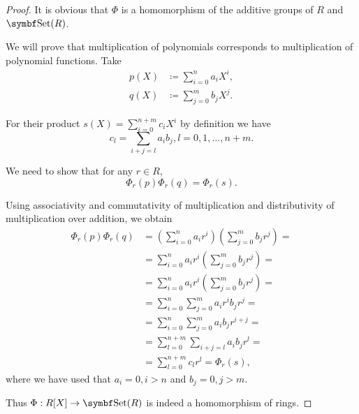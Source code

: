 \begin{proof}
  It is obvious that \( \Phi \) is a homomorphism of the additive groups of \( R \) and \( \Cat{Set}(R) \).

  We will prove that multiplication of polynomials corresponds to multiplication of polynomial functions. Take
  \begin{align*}
    p(X) &\coloneqq \sum_{i=0}^n a_i X^i, \\
    q(X) &\coloneqq \sum_{j=0}^m b_j X^j.
  \end{align*}

  For their product \( s(X) = \sum_{i=0}^{n + m} c_i X^i \) by definition we have
  \begin{equation*}
    c_l = \sum_{i+j=l} a_i b_j, l = 0, 1, \ldots, n + m.
  \end{equation*}

  We need to show that for any \( r \in R \),
  \begin{equation*}
    \Phi_r(p) \Phi_r(q) = \Phi_r(s).
  \end{equation*}

  Using associativity and commutativity of multiplication and distributivity of multiplication over addition, we obtain
  \begin{align*}
    \Phi_r(p) \Phi_r(q)
    &=
    \left( \sum_{i=0}^n a_i r^i \right) \left( \sum_{j=0}^m b_j r^j \right)
    = \\ &=
    \sum_{i=0}^n a_i r^i \left( \sum_{j=0}^m b_j r^j \right)
    = \\ &=
    \sum_{i=0}^n a_i r^i \left( \sum_{j=0}^m b_j r^j \right)
    = \\ &=
    \sum_{i=0}^n \sum_{j=0}^m a_i r^i b_j r^j
    = \\ &=
    \sum_{i=0}^n \sum_{j=0}^m a_i b_j r^{i + j}
    = \\ &=
    \sum_{l=0}^{n + m} \sum_{i+j=l} a_i b_j r^l
    = \\ &=
    \sum_{l=0}^{n + m} c_l r^l
    =
    \Phi_r(s),
  \end{align*}
  where we have used that \( a_i = 0, i > n \) and \( b_j = 0, j > m \).

  Thus \( \Phi: R[X] \to \Cat{Set}(R) \) is indeed a homomorphism of rings.
\end{proof}

